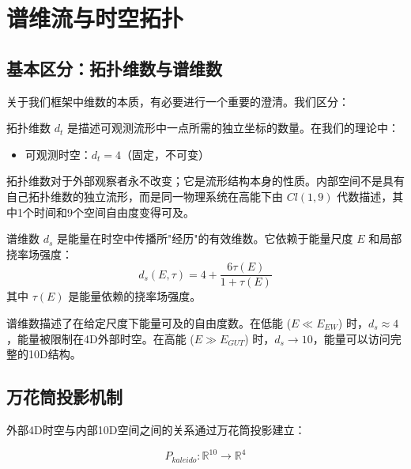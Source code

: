 \section{谱维流与时空拓扑}
\label{sec:spectral_topology}

\subsection{基本区分：拓扑维数与谱维数}

关于我们框架中维数的本质，有必要进行一个重要的澄清。我们区分：

\begin{definition}[拓扑维数]
拓扑维数 $d_t$ 是描述可观测流形中一点所需的独立坐标的数量。在我们的理论中：
\begin{itemize}
    \item 可观测时空：$d_t = 4$（固定，不可变）
\end{itemize}
拓扑维数对于外部观察者永不改变；它是流形结构本身的性质。内部空间不是具有自己拓扑维数的独立流形，而是同一物理系统在高能下由 $Cl(1,9)$ 代数描述，其中1个时间和9个空间自由度变得可及。
\end{definition}

\begin{definition}[谱维数]
谱维数 $d_s$ 是能量在时空中传播所"经历"的有效维数。它依赖于能量尺度 $E$ 和局部挠率场强度：
\begin{equation}
    d_s(E, \tau) = 4 + \frac{6\tau(E)}{1 + \tau(E)}
    \label{eq:spectral_dimension}
\end{equation}
其中 $\tau(E)$ 是能量依赖的挠率场强度。
\end{definition}

\begin{remark}[物理解释]
谱维数描述了在给定尺度下能量可及的自由度数。在低能 ($E \ll E_{EW}$) 时，$d_s \approx 4$，能量被限制在4D外部时空。在高能 ($E \gg E_{GUT}$) 时，$d_s \to 10$，能量可以访问完整的10D结构。
\end{remark}

\subsection{万花筒投影机制}

外部4D时空与内部10D空间之间的关系通过万花筒投影建立：

\begin{equation}
    P_{kaleido}: \mathbb{R}^{10} \to \mathbb{R}^4
    \label{eq:kaleidoscopic_projection}
\end{equation}

